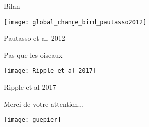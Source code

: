 \documentclass[10pt]{beamer}
\begin{document}
\begin{frame}{Bilan}
\begin{center}
\texttt{[image: global\_change\_bird\_pautasso2012]}
\end{center}
\footnotesize{Pautasso et al. 2012}
\end{frame}


\begin{frame}{Pas que les oiseaux}
\begin{center}
\texttt{[image: Ripple\_et\_al\_2017]}
\end{center}
\begin{tiny}
 Ripple et al 2017
\end{tiny}

\end{frame}



\begin{frame}[plain]
\begin{center}
\begin{huge}
 Merci de votre attention...
\end{huge}
\texttt{[image: guepier]}
\end{center}
 \end{frame}
\end{document}
